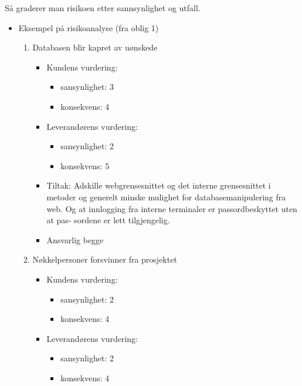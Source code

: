 \documentclass[11pt]{article}
\begin{document}
    Så graderer man risikoen etter sannsynlighet og utfall.
\begin{itemize}

\item Eksempel på risikoanalyse (fra oblig 1)\\
\label{sec-5.3.3.1}%
\begin{enumerate}
\item Databasen blir kapret av uønskede

\begin{itemize}
\item Kundens vurdering:

\begin{itemize}
\item sansynlighet:
            3
\item konsekvens:
            4
\end{itemize}

\item Leverandørens vurdering:

\begin{itemize}
\item sansynlighet:
            2
\item konsekvens:
            5
\end{itemize}

\item Tiltak:
          Adskille webgrensesnittet og det interne grensesnittet i metoder
          og generelt minske mulighet for databasemanipulering fra web. Og
          at innlogging fra interne terminaler er passordbeskyttet uten at pas-
          sordene er lett tilgjengelig.
\item Ansvarlig
          begge
\end{itemize}

\item Nøkkelpersoner forsvinner fra prosjektet

\begin{itemize}
\item Kundens vurdering:

\begin{itemize}
\item sansynlighet:
            2
\item konsekvens:
            4
\end{itemize}

\item Leverandørens vurdering:

\begin{itemize}
\item sansynlighet:
            2
\item konsekvens:
            4
\end{itemize}


\end{itemize}
\end{enumerate}
\end{itemize}
\end{document}
